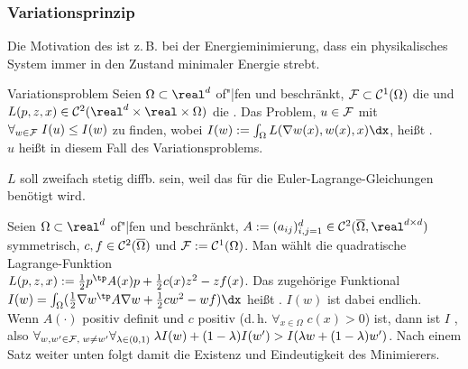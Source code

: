 \pagebreak

\subsubsection{%
    Variationsprinzip%
}

\begin{Bem}
    Die Motivation des  ist z.\,B. bei der Energieminimierung, dass
    ein physikalisches System immer in den Zustand minimaler Energie strebt.
\end{Bem}

\begin{Def}{Variationsproblem}
    Seien $\Omega \subset \real^d$ of"|fen und beschränkt,
    $\mathcal{F} \subset \mathcal{C}^1(\Omega)$ die  und
    $L(p, z, x) \in \C^2(\real^d \times \real \times \Omega)$ die
    .
    Das Problem, $u \in \mathcal{F}$ mit $\forall_{w \in \mathcal{F}}\; I(u) \le I(w)$ zu finden,
    wobei $I(w) := \int_\Omega L(\nabla w(x), w(x), x) \dx$, heißt .\\
    $u$ heißt in diesem Fall  des Variationsproblems.
\end{Def}

\begin{Bem}
    $L$ soll zweifach stetig diffb. sein, weil das für die Euler-Lagrange-Gleichungen benötigt
    wird.
\end{Bem}

\linie

\begin{Bsp}
    Seien $\Omega \subset \real^d$ of"|fen und beschränkt,
    $A := (a_{ij})_{i,j=1}^d \in \C^2(\overline{\Omega}, \real^{d \times d})$
    symmetrisch, $c, f \in \mathcal{C}^2(\overline{\Omega})$ und $\mathcal{F} := \mathcal{C}^1(\Omega)$.
    Man wählt die quadratische Lagrange-Funktion\\
    $L(p, z, x) := \frac{1}{2} p^\tp A(x) p + \frac{1}{2} c(x) z^2 - z f(x)$.
    Das zugehörige Funktional\\
    $I(w) = \int_\Omega (\frac{1}{2} \nabla w^\tp A \nabla w + \frac{1}{2} cw^2 - wf) \dx$
    heißt .
    $I(w)$ ist dabei endlich.\\
    Wenn $A(\cdot)$ positiv definit und $c$ positiv (d.\,h. $\forall_{x \in \Omega}\; c(x) > 0$)
    ist,
    dann ist $I$ , also
    $\forall_{w, w' \in \mathcal{F},\; w \not= w'} \forall_{\lambda \in (0, 1)}\;
    \lambda I(w) + (1 - \lambda) I(w') > I(\lambda w + (1-\lambda) w')$.
    Nach einem Satz weiter unten folgt damit die Existenz und Eindeutigkeit des Minimierers.
\end{Bsp}

